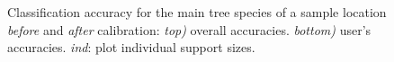 \begin{figure}[H]
	\centering
	\caption{Classification accuracy for the main tree species of a sample location \textit{before} and \textit{after} calibration: \textit{top)} overall accuracies. \textit{bottom)} user's accuracies. \textit{ind}: plot individual support sizes.}
	\label{fig:cos_oaa_ua}
\end{figure}


